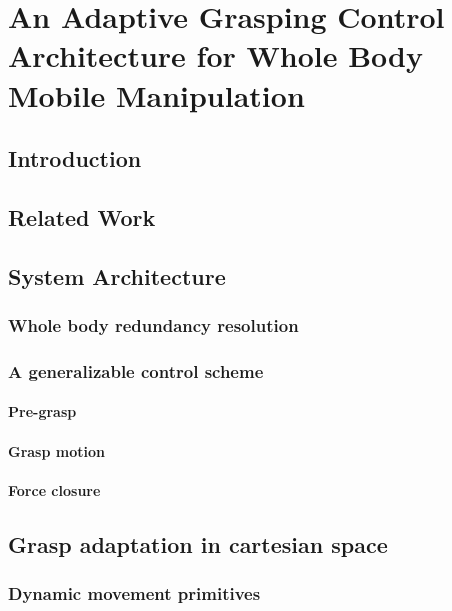 \chapter{An Adaptive Grasping Control Architecture for Whole Body Mobile Manipulation}

\section{Introduction}

\section{Related Work}

\section{System Architecture}

\subsection{Whole body redundancy resolution}

\subsection{A generalizable control scheme}

\subsubsection{Pre-grasp} 

\subsubsection{Grasp motion}

\subsubsection{Force closure}

\section{Grasp adaptation in cartesian space}

\subsection{Dynamic movement primitives}


